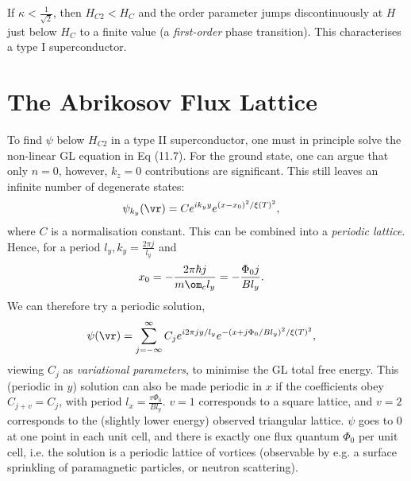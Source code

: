 \documentclass[a4paper, 11pt, normalem]{report}
\begin{document}
If $\kappa<\frac{1}{\sqrt{2}}$, then $H_{C2}<H_C$ and the order parameter jumps discontinuously at $H$ just below $H_C$ to a finite value (a \emph{first-order} phase transition).
This characterises a type I superconductor.

\section{The Abrikosov Flux Lattice}
To find $\psi$ below $H_{C2}$ in a type II superconductor, one must in principle solve the non-linear GL equation in Eq (11.7).
For the ground state, one can argue that only $n=0$, however, $k_z=0$ contributions are significant.
This still leaves an infinite number of degenerate states:
\begin{align}
    \psi_{k_y}(\vr) &= Ce^{ik_yy}e^{(x-x_0)^2/\xi(T)^2},
\end{align}
where $C$ is a normalisation constant.
This can be combined into a \emph{periodic lattice}.
Hence, for a period $l_y,k_y=\frac{2\pi j}{l_y}$ and
\begin{align}
    x_0 &= -\frac{2\pi\hbar j}{m\om_c l_y} = -\frac{\Phi_0j}{Bl_y}.
\end{align}
We can therefore try a periodic solution,
\begin{align}
    \psi(\vr) &= \sum_{j=-\infty}^{\infty} C_je^{i2\pi jy/l_y}e^{-(x+j\Phi_0/Bl_y)^2/\xi(T)^2},
\end{align}
viewing $C_j$ as \emph{variational parameters}, to minimise the GL total free energy.
This (periodic in $y$) solution can also be made periodic in $x$ if the coefficients obey $C_{j+v}=C_j$, with period $l_x=\frac{v\Phi_0}{Bl_y}$.
$v=1$ corresponds to a square lattice, and $v=2$ corresponds to the (slightly lower energy) observed triangular lattice.
$\psi$ goes to 0 at one point in each unit cell, and there is exactly one flux quantum $\Phi_0$ per unit cell, i.e. the solution is a periodic lattice of vortices (observable by e.g. a surface sprinkling of paramagnetic particles, or neutron scattering).
\end{document}
